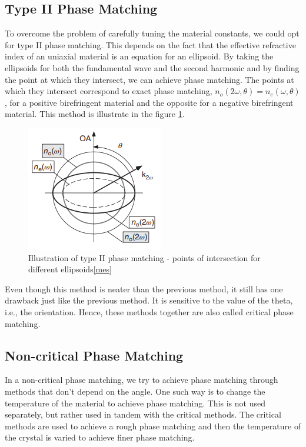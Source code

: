 \subsection{Type II Phase Matching}
To overcome the problem of carefully tuning the material constants, we could opt for type II phase matching. This depends on the fact that the effective refractive index of an uniaxial material is an equation for an ellipsoid. By taking the ellipsoids for both the fundamental wave and the second harmonic and by finding the point at which they intersect, we can achieve phase matching. The points at which they intersect correspond to exact phase matching, $n_o(2\omega, \theta) = n_e(\omega, \theta)$, for a positive birefringent material and the opposite for a negative birefringent material. This method is illustrate in the figure \ref{fig:phasematching}.\\
\begin{figure}[h!]
\centering
\includegraphics[width = 6 cm]{phase-matching.png}
\caption{Illustration of type II phase matching - points of intersection for different ellipsoids\ref{mes}}
\label{fig:phasematching}
\end{figure}
Even though this method is neater than the previous method, it still has one drawback just like the previous method. It is sensitive to the value of the theta, i.e., the orientation. Hence, these methods together are also called critical phase matching.

\subsection{Non-critical Phase Matching}
In a non-critical phase matching, we try to achieve phase matching through methods that don't depend on the angle. One such way is to change the temperature of the material to achieve phase matching. This is not used separately, but rather used in tandem with the critical methods. The critical methods are used to achieve a rough phase matching and then the temperature of the crystal is varied to achieve finer phase matching.

